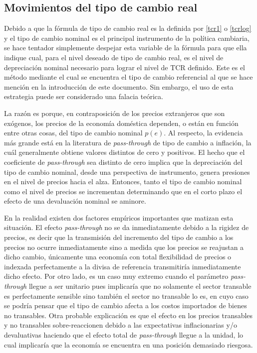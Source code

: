 \documentclass[12pt,letterpaper]{article}
\begin{document}
\subsection{Movimientos del tipo de cambio real}
Debido a que la fórmula de tipo de cambio real es la definida por \ref{tcr1} o \ref{tcrlog} y el tipo de cambio nominal es el principal instrumento de la política cambiaria, se hace tentador simplemente despejar esta variable de la fórmula para que ella indique cual, para el nivel deseado de tipo de cambio real, es el nivel de depreciación nominal necesario para lograr el nivel de TCR definido. Este es el método mediante el cual se encuentra el tipo de cambio referencial al que se hace mención en la introducción de este documento. Sin embargo, el uso de esta estrategia puede ser considerado una falacia teórica.

La razón es porque, en contraposición de los precios extranjeros que son exógenos, los precios de la economía doméstica dependen, o están en función entre otras cosas, del tipo de cambio nominal $p(e)$. Al respecto, la evidencia más grande está en la literatura de \emph{pass-through} de tipo de cambio a inflación, la cuál generalmente obtiene valores distintos de cero y positivos. El hecho que el coeficiente de \emph{pass-through} sea distinto de cero implica que la depreciación del tipo de cambio nominal, desde una perspectiva de instrumento, genera presiones en el nivel de precios hacia el alza. Entonces, tanto el tipo de cambio nominal como el nivel de precios se incrementan determinando que en el corto plazo el efecto de una devaluación nominal se aminore.

En la realidad existen dos factores empíricos importantes que matizan esta situación. El efecto \emph{pass-through} no se da inmediatamente debido a la rigidez de precios, es decir que la transmisión del incremento del tipo de cambio a los precios no ocurre inmediatamente sino a medida que los precios se reajustan a dicho cambio, únicamente una economía con total flexibilidad de precios o indexada perfectamente a la divisa de referencia transmitiría inmediatamente dicho efecto. Por otro lado, es un caso muy extremo cuando el parámetro \emph{pass-through} llegue a ser unitario pues implicaría que no solamente el sector transable es perfectamente sensible sino también el sector no transable lo es, en cuyo caso se podría pensar que el tipo de cambio afecta a los costos importados de bienes no transables. Otra probable explicación es que el efecto en los precios transables y no transables sobre-reaccionen debido a las expectativas inflacionarias y/o devaluativas haciendo que el efecto total de \emph{pass-through} llegue a la unidad, lo cual implicaría que la economía se encuentra en una posición demasiado riesgosa.
\end{document}
